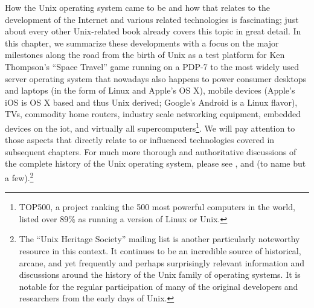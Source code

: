 How the Unix operating system came to be and how that
relates to the development of the Internet and various
related technologies is fascinating; just about every
other Unix-related book already covers this topic in
great detail.  In this chapter, we summarize these
developments with a focus on the major milestones
along the road from the birth of Unix as a test
platform for Ken Thompson's ``Space Travel'' game
running on a PDP-7 to the most widely
used server operating system that nowadays also
happens to power consumer desktops and laptops (in the
form of Linux and Apple's  OS X), mobile devices (Apple's iOS is OS X
based and thus Unix derived; Google's
Android is a Linux
flavor), TVs, commodity home routers, industry scale
networking equipment, embedded devices on the
\gls{iot}, and virtually all
supercomputers\footnote{TOP500\cite{history:top500}, a
project ranking the 500 most powerful computers in the
world, listed over 89\% as running a version of Linux
or Unix.}.  We will pay attention to those aspects
that directly relate to or influenced technologies
covered in subsequent chapters.  For much more
thorough and authoritative discussions of the complete
history of the Unix operating system, please see
\cite{history:bell-labs-unix-history},
\cite{history:dmr-history} and
\cite{history:esr-taoup} (to name but a
few).\footnote{The ``Unix Heritage Society'' mailing
list\cite{history:tuhsml} is another particularly
noteworthy resource in this context.  It continues to
be an incredible source of historical, arcane, and yet
frequently and perhaps surprisingly relevant
information and discussions around the history of the
Unix family of operating systems.  It is notable for
the regular participation of many of the original
developers and researchers from the early days of
Unix.} \\

